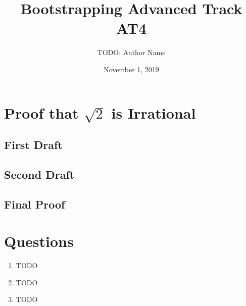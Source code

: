 \documentclass[12pt]{article}
\begin{document}
\title{Bootstrapping Advanced Track AT4}
\author{TODO: Author Name}
\date{November 1, 2019}

\maketitle


\section*{Proof that $ \sqrt{2} $ is Irrational}


\subsection*{First Draft}


\subsection*{Second Draft}


\subsection*{Final Proof}





\section*{Questions}


\begin{enumerate}
  \item TODO

  \item TODO

  \item TODO


\end{enumerate}
\end{document}
